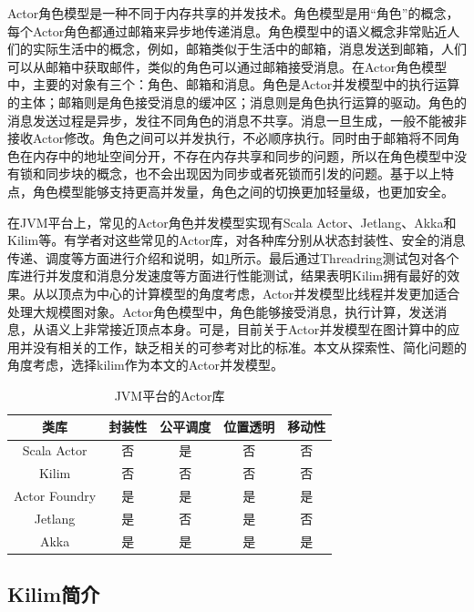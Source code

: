 Actor角色模型是一种不同于内存共享的并发技术。角色模型是用“角色”的概念，每个Actor角色都通过邮箱来异步地传递消息。角色模型中的语义概念非常贴近人们的实际生活中的概念，例如，邮箱类似于生活中的邮箱，消息发送到邮箱，人们可以从邮箱中获取邮件，类似的角色可以通过邮箱接受消息。在Actor角色模型中，主要的对象有三个：角色、邮箱和消息。角色是Actor并发模型中的执行运算的主体；邮箱则是角色接受消息的缓冲区；消息则是角色执行运算的驱动。角色的消息发送过程是异步，发往不同角色的消息不共享。消息一旦生成，一般不能被非接收Actor修改。角色之间可以并发执行，不必顺序执行。同时由于邮箱将不同角色在内存中的地址空间分开，不存在内存共享和同步的问题，所以在角色模型中没有锁和同步块的概念，也不会出现因为同步或者死锁而引发的问题。基于以上特点，角色模型能够支持更高并发量，角色之间的切换更加轻量级，也更加安全。

在JVM平台上，常见的Actor角色并发模型实现有Scala Actor、Jetlang、Akka和Kilim等。有学者\cite{karmani2009actor}对这些常见的Actor库，对各种库分别从状态封装性、安全的消息传递、调度等方面进行介绍和说明，如\ref{table:actors}所示。最后通过Threadring测试包对各个库进行并发度和消息分发速度等方面进行性能测试，结果表明Kilim拥有最好的效果。从以顶点为中心的计算模型的角度考虑，Actor并发模型比线程并发更加适合处理大规模图对象。Actor角色模型中，角色能够接受消息，执行计算，发送消息，从语义上非常接近顶点本身。可是，目前关于Actor并发模型在图计算中的应用并没有相关的工作，缺乏相关的可参考对比的标准。本文从探索性、简化问题的角度考虑，选择kilim作为本文的Actor并发模型。

\begin{table}[htbp]
\caption{JVM平台的Actor库}\label{table:actors}
\vspace{0.5em}\centering\wuhao
\begin{tabular}{|c|c|c|c|c|}
\toprule[1.5pt]
类库 & 封装性   & 公平调度   & 位置透明 & 移动性  \\
\midrule[1pt]
Scala Actor & 否 &是& 否 & 否\\
Kilim & 否 & 否 & 否 & 否\\
Actor Foundry & 是 & 是& 是 & 是\\
Jetlang & 是 & 否 & 是 &  否 \\
Akka &  是 & 是& 是 & 是\\
\bottomrule[1.5pt]
\end{tabular}
\vspace{\baselineskip}
\end{table}


\subsection{Kilim简介}

